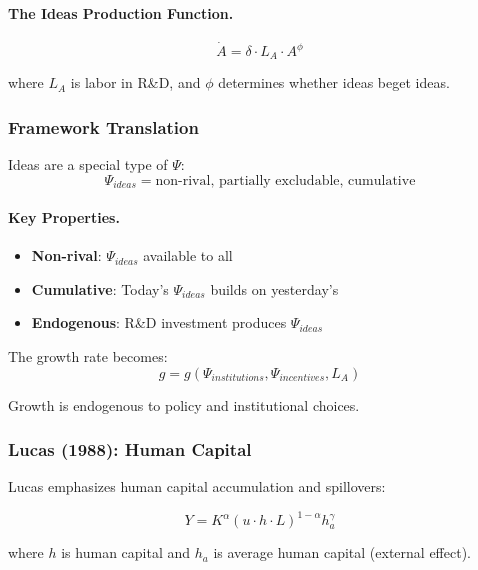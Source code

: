\paragraph{The Ideas Production Function.}
\begin{equation}
\dot{A} = \delta \cdot L_A \cdot A^\phi
\end{equation}

where $L_A$ is labor in R\&D, and $\phi$ determines whether ideas beget ideas.

\subsubsection{Framework Translation}

Ideas are a special type of $\Psi$:
\begin{equation}
\Psi_{ideas} = \text{non-rival, partially excludable, cumulative}
\end{equation}

\paragraph{Key Properties.}
\begin{itemize}
    \item \textbf{Non-rival}: $\Psi_{ideas}$ available to all
    \item \textbf{Cumulative}: Today's $\Psi_{ideas}$ builds on yesterday's
    \item \textbf{Endogenous}: R\&D investment produces $\Psi_{ideas}$
\end{itemize}

The growth rate becomes:
\begin{equation}
g = g(\Psi_{institutions}, \Psi_{incentives}, L_A)
\end{equation}

Growth is endogenous to policy and institutional choices.

\subsubsection{Lucas (1988): Human Capital}

Lucas emphasizes human capital accumulation and spillovers:

\begin{equation}
Y = K^\alpha (u \cdot h \cdot L)^{1-\alpha} h_a^\gamma
\end{equation}

where $h$ is human capital and $h_a$ is average human capital (external effect).

